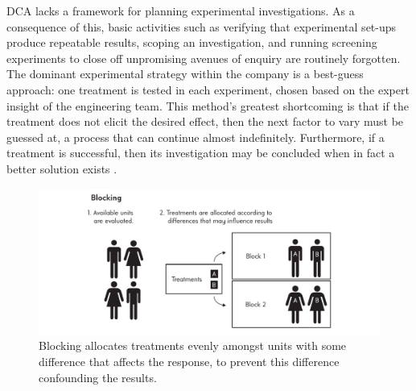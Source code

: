 \documentclass[11pt,a4paper,article]{memoir} %
\begin{document}
DCA lacks a framework for planning experimental investigations. As a consequence of this, basic activities such as verifying that experimental set-ups produce repeatable results, scoping an investigation, and running screening experiments to close off unpromising avenues of enquiry are routinely forgotten. The dominant experimental strategy within the company is a best-guess approach: one treatment is tested in each experiment, chosen based on the expert insight of the engineering team. This method's greatest shortcoming is that if the treatment does not elicit the desired effect, then the next factor to vary must be guessed at, a process that can continue almost indefinitely. Furthermore, if a treatment is successful, then its investigation may be concluded when in fact a better solution exists \cite{montgomery2000design}.
\par
\begin{figure}
\includegraphics[width=\textwidth]{Blocking.pdf}
\caption{Blocking allocates treatments evenly amongst units with some difference that affects the response, to prevent this difference confounding the results.}
\label{fig:blocking}
\end{figure}
\par
\end{document}
